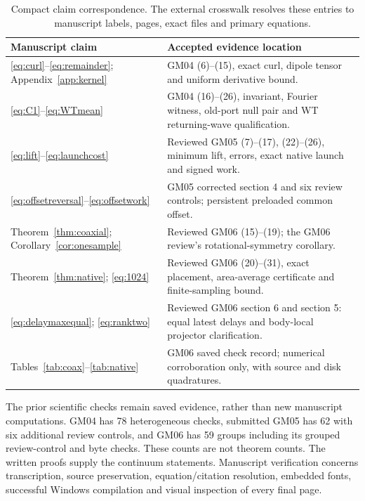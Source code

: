 \begin{table}[htbp]\centering\small
\begin{tabularx}{\textwidth}{@{}p{}Y@{}}\toprule
Manuscript claim&Accepted evidence location\\\midrule
\eqref{eq:curl}--\eqref{eq:remainder}; Appendix~\ref{app:kernel}&
GM04 (6)--(15), exact curl, dipole tensor and uniform derivative bound.\\[3pt]
\eqref{eq:C1}--\eqref{eq:WTmean}&
GM04 (16)--(26), invariant, Fourier witness, old-port null pair and WT returning-wave qualification.\\[3pt]
\eqref{eq:lift}--\eqref{eq:launchcost}&
Reviewed GM05 (7)--(17), (22)--(26), minimum lift, errors, exact native launch and signed work.\\[3pt]
\eqref{eq:offsetreversal}--\eqref{eq:offsetwork}&
GM05 corrected section 4 and six review controls; persistent preloaded common offset.\\[3pt]
Theorem~\ref{thm:coaxial}; Corollary~\ref{cor:onesample}&
Reviewed GM06 (15)--(19); the GM06 review's rotational-symmetry corollary.\\[3pt]
Theorem~\ref{thm:native}; \eqref{eq:1024}&
Reviewed GM06 (20)--(31), exact placement, area-average certificate and finite-sampling bound.\\[3pt]
\eqref{eq:delaymaxequal}; \eqref{eq:ranktwo}&
Reviewed GM06 section 6 and section 5: equal latest delays and body-local projector clarification.\\[3pt]
Tables~\ref{tab:coax}--\ref{tab:native}&
GM06 saved check record; numerical corroboration only, with source and disk quadratures.\\\bottomrule
\end{tabularx}
\caption{Compact claim correspondence. The external crosswalk resolves these entries to manuscript labels, pages, exact files and primary equations.}\label{tab:crosswalk}
\end{table}

The prior scientific checks remain saved evidence, rather than new manuscript computations. GM04 has 78 heterogeneous checks, submitted GM05 has 62 with six additional review controls, and GM06 has 59 groups including its grouped review-control and byte checks. These counts are not theorem counts. The written proofs supply the continuum statements. Manuscript verification concerns transcription, source preservation, equation/citation resolution, embedded fonts, successful Windows compilation and visual inspection of every final page.
